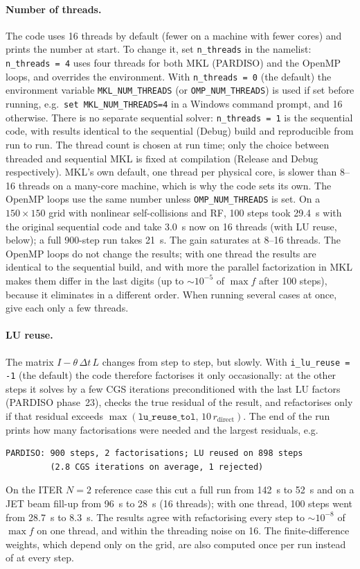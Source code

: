 \documentclass[11pt,a4paper]{article}
\begin{document}
\paragraph{Number of threads.}\label{sec:threads}  The code uses 16 threads by default (fewer on a
machine with fewer cores) and prints the number at start.  To change it, set
\texttt{n\_threads} in the namelist: \texttt{n\_threads = 4} uses four threads
for both MKL (PARDISO) and the OpenMP loops, and overrides the environment.
With \texttt{n\_threads = 0} (the default) the environment variable
\texttt{MKL\_NUM\_THREADS} (or \texttt{OMP\_NUM\_THREADS}) is used if set before
running, e.g.\ \texttt{set MKL\_NUM\_THREADS=4} in a Windows command prompt, and
16 otherwise.  There is no separate sequential solver: \texttt{n\_threads = 1}
is the sequential code, with results identical to the sequential (Debug) build
and reproducible from run to run.  The thread count is chosen at run time; only
the choice between threaded and sequential MKL is fixed at compilation (Release
and Debug respectively).  MKL's own default, one thread per physical core, is slower than 8--16
threads on a many-core machine, which is why the code sets its own.  The OpenMP
loops use the same number unless \texttt{OMP\_NUM\_THREADS} is set.  On a
$150\times150$ grid with nonlinear self-collisions and RF, 100 steps took 29.4~s
with the original sequential code and take 3.0~s now on 16 threads (with LU
reuse, below); a full 900-step run takes 21~s.  The gain saturates at 8--16
threads.  The OpenMP loops do not change the results; with one thread the
results are identical to the sequential build, and with more the parallel
factorization in MKL makes them differ in the last digits (up to
${\sim}10^{-5}$ of $\max f$ after 100 steps), because it eliminates in a
different order.  When running several cases at once, give each only a few
threads.

\paragraph{LU reuse.}\label{sec:lureuse}  The matrix $I - \theta\,\Delta t\,L$
changes from step to step, but slowly.  With \texttt{i\_lu\_reuse = -1} (the
default) the code therefore factorises it only occasionally: at the other steps
it solves by a few CGS iterations preconditioned with the last LU factors
(PARDISO phase~23), checks the true residual of the result, and refactorises
only if that residual exceeds
$\max(\texttt{lu\_reuse\_tol},\,10\,r_\mathrm{direct})$.  The end of the run
prints how many factorisations were needed and the largest residuals, e.g.
\begin{lstlisting}
PARDISO: 900 steps, 2 factorisations; LU reused on 898 steps
         (2.8 CGS iterations on average, 1 rejected)
\end{lstlisting}
On the ITER $N=2$ reference case this cut a full run from 142~s to 52~s and on a
JET beam fill-up from 96~s to 28~s (16 threads); with one thread, 100 steps went
from 28.7~s to 8.3~s.  The results agree with refactorising every step to
${\sim}10^{-8}$ of $\max f$ on one thread, and within the threading noise on
16.  The finite-difference weights, which depend only on the grid, are also
computed once per run instead of at every step.
\end{document}
